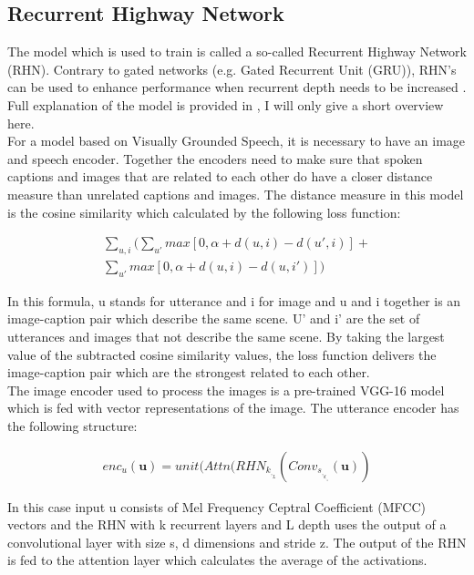 \documentclass[a4paper, oneside]{book}
\begin{document}
\subsection{Recurrent Highway Network}\label{models:recurrent-highway-network}

The model which is used to train is called a so-called Recurrent Highway Network (RHN). Contrary to gated networks (e.g. Gated Recurrent Unit (GRU)), RHN’s can be used to enhance performance when recurrent depth needs to be increased \cite{ZillySKS16}. Full explanation of the model is provided in \cite{ChrupalaGA17}, I will only give a short overview here. \\ 

For a model based on Visually Grounded Speech, it is necessary to have an image and speech encoder. Together the encoders need to make sure that spoken captions and images that are related to each other do have a closer distance measure than unrelated captions and images. The distance measure in this model is the cosine similarity which calculated by the following loss function:

\begin{eqnarray}
 \sum\limits_{u, i} \Bigg( \sum\limits_{u'} max[0,\alpha + d(u,i) - d(u',i)] + \\ \nonumber
 \sum\limits_{u'} max[0,\alpha + d(u,i) - d(u,i')] \Bigg)
\end{eqnarray}

In this formula, u stands for utterance and i for image and u and i together is an image-caption pair which describe the same scene. U’ and i’ are the set of utterances and images that not describe the same scene. By taking the largest value of the subtracted cosine similarity values, the loss function delivers the image-caption pair which are the strongest related to each other. \\

The image encoder used to process the images is a pre-trained VGG-16 model \cite{Simonyan14c} which is fed with vector representations of the image. The utterance encoder has the following structure:

\begin{eqnarray}
 enc_u(\textbf{u}) = unit(Attn(RHN_k_,_L (Conv_s_,_d_,_z (\textbf{u}))
\end{eqnarray}

In this case input u consists of Mel Frequency Ceptral Coefficient (MFCC) vectors and the RHN with k recurrent layers and L depth uses the output of a convolutional layer with size s, d dimensions and stride z. The output of the RHN is fed to the attention layer which calculates the average of the activations.
\end{document}
